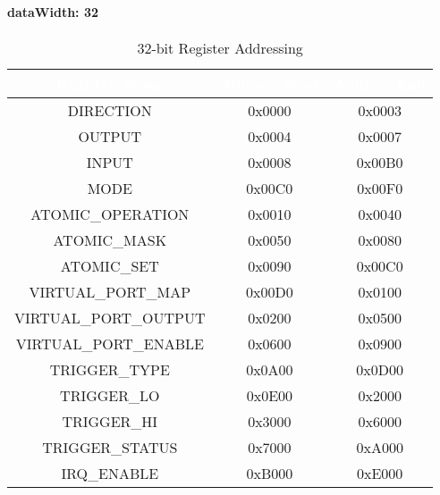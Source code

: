 \paragraph{dataWidth: 32}
\begin{table}[h]
  \centering
  \begin{tabular}{|c|c|c|}
      \hline
      \rowcolor{dark-gray}  %
      \textcolor{white}{\textbf{Register Name}} & \textcolor{white}{\textbf{Address Start}} & \textcolor{white}{\textbf{Address End}} \\ \hline
      DIRECTION & 0x0000 & 0x0003 \\ \hline
      OUTPUT & 0x0004 & 0x0007 \\ \hline
      INPUT & 0x0008 & 0x00B0 \\ \hline
      MODE & 0x00C0 & 0x00F0 \\ \hline
      ATOMIC\_OPERATION & 0x0010 & 0x0040 \\ \hline
      ATOMIC\_MASK & 0x0050 & 0x0080 \\ \hline
      ATOMIC\_SET & 0x0090 & 0x00C0 \\ \hline
      VIRTUAL\_PORT\_MAP & 0x00D0 & 0x0100 \\ \hline
      VIRTUAL\_PORT\_OUTPUT & 0x0200 & 0x0500 \\ \hline
      VIRTUAL\_PORT\_ENABLE & 0x0600 & 0x0900\\ \hline
      TRIGGER\_TYPE & 0x0A00 & 0x0D00 \\ \hline
      TRIGGER\_LO & 0x0E00 & 0x2000 \\ \hline
      TRIGGER\_HI & 0x3000 & 0x6000 \\ \hline
      TRIGGER\_STATUS & 0x7000 & 0xA000 \\ \hline
      IRQ\_ENABLE & 0xB000 & 0xE000\\ \hline
  \end{tabular}
  \caption{32-bit Register Addressing}
\end{table}
